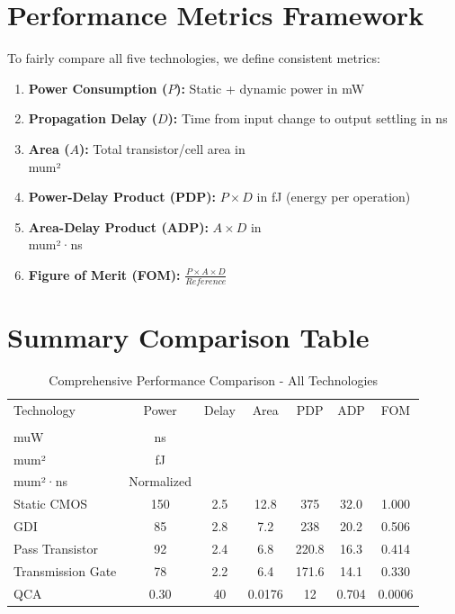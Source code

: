 \documentclass[12pt,a4paper,twoside]{report}
\begin{document}
\section{Performance Metrics Framework}

To fairly compare all five technologies, we define consistent metrics:

\begin{enumerate}
    \item \textbf{Power Consumption ($P$):} Static + dynamic power in mW
    \item \textbf{Propagation Delay ($D$):} Time from input change to output settling in ns
    \item \textbf{Area ($A$):} Total transistor/cell area in \\mum²
    \item \textbf{Power-Delay Product (PDP):} $P \times D$ in fJ (energy per operation)
    \item \textbf{Area-Delay Product (ADP):} $A \times D$ in \\mum²·ns
    \item \textbf{Figure of Merit (FOM):} $\frac{P \times A \times D}{Reference}$
\end{enumerate}

\section{Summary Comparison Table}

\begin{table}[H]
\centering
\caption{Comprehensive Performance Comparison - All Technologies}
\label{tab:all_comparison}
\begin{tabularx}{\textwidth}{lcccccc}
\toprule
Technology & Power & Delay & Area & PDP & ADP & FOM \\
 & \\muW & ns & \\mum² & fJ & \\mum²·ns & Normalized \\
\midrule
Static CMOS & 150 & 2.5 & 12.8 & 375 & 32.0 & 1.000 \\
GDI & 85 & 2.8 & 7.2 & 238 & 20.2 & 0.506 \\
Pass Transistor & 92 & 2.4 & 6.8 & 220.8 & 16.3 & 0.414 \\
Transmission Gate & 78 & 2.2 & 6.4 & 171.6 & 14.1 & 0.330 \\
QCA & 0.30 & 40 & 0.0176 & 12 & 0.704 & 0.0006 \\
\bottomrule
\end{tabularx}
\end{table}
\end{document}
